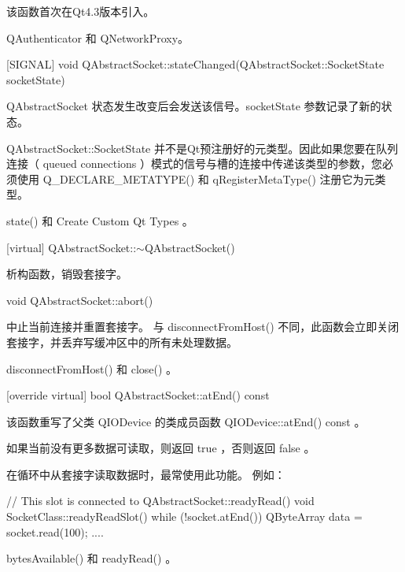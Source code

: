 该函数首次在Qt4.3版本引入。

\begin{seeAlso}
QAuthenticator 和 QNetworkProxy。
\end{seeAlso}

[SIGNAL] void
QAbstractSocket::stateChanged(QAbstractSocket::SocketState
socketState)

QAbstractSocket 状态发生改变后会发送该信号。socketState 参数记录了新的状态。

\begin{notice}
QAbstractSocket::SocketState 并不是Qt预注册好的元类型。因此如果您要在队列连接（ queued connections ）模式的信号与槽的连接中传递该类型的参数，您必须使用 Q\_DECLARE\_METATYPE() 和 qRegisterMetaType() 注册它为元类型。
\end{notice}


\begin{seeAlso}
state() 和 Create Custom Qt Types 。
\end{seeAlso}


[virtual] QAbstractSocket::$\sim$QAbstractSocket()

析构函数，销毁套接字。

void QAbstractSocket::abort()

中止当前连接并重置套接字。 与 disconnectFromHost() 不同，此函数会立即关闭套接字，并丢弃写缓冲区中的所有未处理数据。



\begin{seeAlso}
 disconnectFromHost() 和 close() 。
\end{seeAlso}

[override virtual] bool QAbstractSocket::atEnd() const

该函数重写了父类 QIODevice 的类成员函数 QIODevice::atEnd() const 。

如果当前没有更多数据可读取，则返回 true ，否则返回 false 。

在循环中从套接字读取数据时，最常使用此功能。 例如：

\begin{cppcode}
// This slot is connected to QAbstractSocket::readyRead()
void SocketClass::readyReadSlot()
{
	while (!socket.atEnd()) {
		QByteArray data = socket.read(100);
		....
	}
}
\end{cppcode}



\begin{seeAlso}
bytesAvailable() 和 readyRead() 。
\end{seeAlso}

